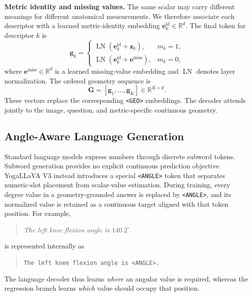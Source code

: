 \documentclass[conference]{IEEEtran}
\begin{document}
\noindent\textbf{Metric identity and missing values.}
The same scalar may carry different meanings for different anatomical measurements.
We therefore associate each descriptor with a learned metric-identity embedding $\mathbf{e}^{\mathrm{id}}_k\in\mathbb{R}^{d}$.
The final token for descriptor $k$ is
\begin{equation}
    \mathbf{g}_k=
    \begin{cases}
    \operatorname{LN}\!\left(
        \mathbf{e}^{\mathrm{id}}_k+\mathbf{z}_k
    \right), & m_k=1,\\[5pt]
    \operatorname{LN}\!\left(
        \mathbf{e}^{\mathrm{id}}_k+\mathbf{e}^{\mathrm{miss}}
    \right), & m_k=0,
    \end{cases}
    \label{eq:geometry_token}
\end{equation}
where $\mathbf{e}^{\mathrm{miss}}\in\mathbb{R}^{d}$ is a learned missing-value embedding and $\operatorname{LN}$ denotes layer normalization.
The ordered geometry sequence is
\begin{equation}
    \mathbf{G}=[\mathbf{g}_1,\ldots,\mathbf{g}_K]
    \in\mathbb{R}^{K\times d}.
    \label{eq:geometry_sequence}
\end{equation}
These vectors replace the corresponding \texttt{<GEO>} embeddings.
The decoder attends jointly to the image, question, and metric-specific continuous geometry.

\subsection{Angle-Aware Language Generation}
\label{sec:angle_generation}

Standard language models express numbers through discrete subword tokens.
Subword generation provides no explicit continuous prediction objective.
YogaLLaVA V3 instead introduces a special \texttt{<ANGLE>} token that separates numeric-slot placement from scalar-value estimation.
During training, every degree value in a geometry-grounded answer is replaced by \texttt{<ANGLE>}, and its normalized value is retained as a continuous target aligned with that token position.
For example,
\begin{quote}
\small
\textit{The left knee flexion angle is $140.2^\circ$.}
\end{quote}
is represented internally as
\begin{quote}
\small
\texttt{The left knee flexion angle is <ANGLE>.}
\end{quote}
The language decoder thus learns \emph{where} an angular value is required, whereas the regression branch learns \emph{which} value should occupy that position.
\end{document}
